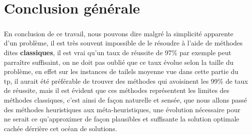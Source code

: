 \chapter*{Conclusion générale}
\paragraph{}
En conclusion de ce travail, nous pouvons dire malgré la simplicité apparente d'un problème, il est très souvent impossible de le résoudre à l'aide de méthodes dites \textbf{classiques}, il est vrai qu'un taux de réussite de 97\% par exemple peut parraître suffisaint, on ne doit pas oublié que ce taux évolue selon la taille du problème, en effet sur les instances de tailels moyenne vue dans cette partie du tp, il aurait été préférable de trouver des méthodes qui avoisinent les 99\% de taux de réussite, mais il est évident que ces méthodes représentent les limites des méthodes classiques, c'est ainsi de façon naturelle et sensée, que nous allons passé des méthodes heuristiques aux méta-heuristiques, une évolution nécessaire pour ne serait ce qu'approximer de façon plausibles et suffisante la solution optimale cachée dérrière cet océan de solutions.